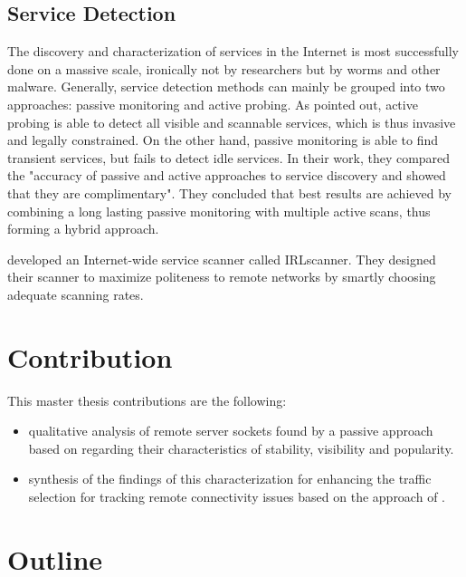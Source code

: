 \subsection{Service Detection} 

The discovery and characterization of services in the Internet is most successfully done on a massive scale, ironically not by researchers but by worms and other malware\citep{Chen:2007}. 
Generally, service detection methods can mainly be grouped into two approaches: passive monitoring and active probing. 
As \citet{Bartlett07b} pointed out, active probing is able to detect all visible and scannable services, which is thus invasive and legally constrained. 
On the other hand, passive monitoring is able to find transient services, but fails to detect idle services. 
In their work, they compared the "accuracy of passive and active approaches to service discovery and showed that they are complimentary"\citep{Bartlett07b}. 
They concluded that best results are achieved by combining a long lasting passive monitoring with multiple active scans, thus forming a hybrid approach\citep{Bartlett07b}. 

\citet{Leonard:2010} developed an Internet-wide service scanner called IRLscanner. 
They designed their scanner to maximize politeness to remote networks by smartly choosing adequate scanning rates. 

\section{Contribution 
\label{sec:contribution}}
This master thesis contributions are the following: 
\begin{itemize}
	\item qualitative analysis of remote server sockets found by a passive approach based on \citet{Schatzmann:Mining,Schatzmann:Dissection, Schatzmann:Tracing} regarding their characteristics of stability, visibility and popularity.
	\item synthesis of the findings of this characterization for enhancing the traffic selection for tracking remote connectivity issues based on the approach of \citet{SchatzmannPAM2011}.
\end{itemize}

\section{Outline
\label{sec:outline}}




